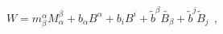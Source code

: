 \begin{equation}
  W = m^{\alpha}_{{\beta}} M_{\alpha}^{{\beta}}
  + b_\alpha B^\alpha + b_i B^i
  + \tilde{b}^{{\beta}} \tilde{B_{{\beta}}}
  + \tilde{b}^{{j}} \tilde{B}_{{j}}~~,
\label{wtree}
\end{equation}

